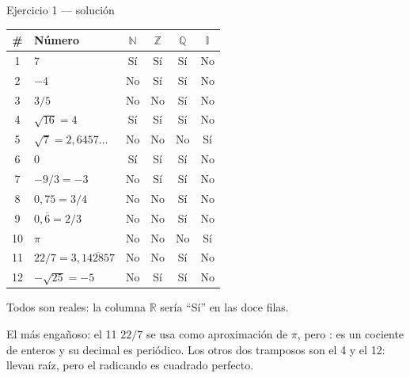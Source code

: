\documentclass[aspectratio=169,10pt]{beamer}
\begin{document}
\begin{frame}{Ejercicio 1 — solución}
  \tiny
  \begin{center}
  \begin{tabular}{@{}clcccc@{}}
    \toprule
    \textbf{\#} & \textbf{Número} & $\mathbb{N}$ & $\mathbb{Z}$ &
    $\mathbb{Q}$ & $\mathbb{I}$ \\
    \midrule
     1 & $7$                          & Sí & Sí & Sí & No \\
     2 & $-4$                         & No & Sí & Sí & No \\
     3 & $3/5$                        & No & No & Sí & No \\
     4 & $\sqrt{16} = 4$              & Sí & Sí & Sí & No \\
     5 & $\sqrt{7} = 2{,}6457\dots$   & No & No & No & Sí \\
     6 & $0$                          & Sí & Sí & Sí & No \\
     7 & $-9/3 = -3$                  & No & Sí & Sí & No \\
     8 & $0{,}75 = 3/4$               & No & No & Sí & No \\
     9 & $0{,}\overline{6} = 2/3$     & No & No & Sí & No \\
    10 & $\pi$                        & No & No & No & Sí \\
    11 & $22/7 = 3{,}\overline{142857}$ & No & No & Sí & No \\
    12 & $-\sqrt{25} = -5$            & No & Sí & Sí & No \\
    \bottomrule
  \end{tabular}
  \end{center}
  {\tiny\color{uniGris} Todos son reales: la columna $\mathbb{R}$ sería ``Sí''
  en las doce filas.}

  \vspace{0.05cm}
  \begin{alertblock}{El más engañoso: el 11}
    \tiny
    $22/7$ se usa como aproximación de $\pi$, pero : es
    un cociente de enteros y su decimal es periódico.  Los otros dos tramposos son
    el 4 y el 12: llevan raíz, pero el radicando es cuadrado perfecto.
  \end{alertblock}
\end{frame}
\end{document}
